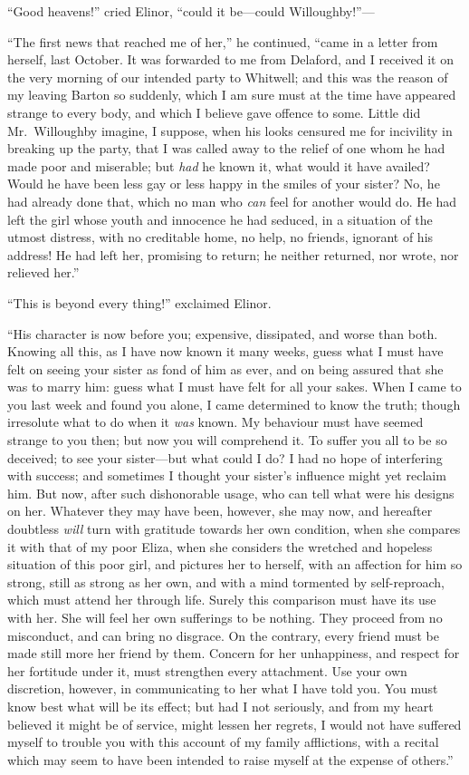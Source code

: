 ``Good heavens!'' cried Elinor, ``could it be---could
Willoughby!''---%

``The first news that reached me of her,'' he continued,
``came in a letter from herself, last October.
It was forwarded to me from Delaford, and I received it
on the very morning of our intended party to Whitwell;
and this was the reason of my leaving Barton so suddenly,
which I am sure must at the time have appeared strange
to every body, and which I believe gave offence to some.
Little did Mr.\ Willoughby imagine, I suppose, when his
looks censured me for incivility in breaking up the party,
that I was called away to the relief of one whom he
had made poor and miserable; but \emph{had} he known it,
what would it have availed?  Would he have been less
gay or less happy in the smiles of your sister?  No,
he had already done that, which no man who \emph{can} feel
for another would do.  He had left the girl whose
youth and innocence he had seduced, in a situation of
the utmost distress, with no creditable home, no help,
no friends, ignorant of his address!  He had left her,
promising to return; he neither returned, nor wrote,
nor relieved her.''

``This is beyond every thing!'' exclaimed Elinor.

``His character is now before you; expensive, dissipated,
and worse than both.  Knowing all this, as I have now
known it many weeks, guess what I must have felt on seeing
your sister as fond of him as ever, and on being assured
that she was to marry him: guess what I must have felt
for all your sakes.  When I came to you last week and
found you alone, I came determined to know the truth;
though irresolute what to do when it \emph{was} known.
My behaviour must have seemed strange to you then;
but now you will comprehend it.  To suffer you all to be
so deceived; to see your sister---but what could I do?
I had no hope of interfering with success; and sometimes
I thought your sister's influence might yet reclaim him.
But now, after such dishonorable usage, who can tell what
were his designs on her.  Whatever they may have been,
however, she may now, and hereafter doubtless \emph{will}
turn with gratitude towards her own condition, when she
compares it with that of my poor Eliza, when she considers
the wretched and hopeless situation of this poor girl,
and pictures her to herself, with an affection for him so strong,
still as strong as her own, and with a mind tormented
by self-reproach, which must attend her through life.
Surely this comparison must have its use with her.
She will feel her own sufferings to be nothing.  They
proceed from no misconduct, and can bring no disgrace.
On the contrary, every friend must be made still more
her friend by them.  Concern for her unhappiness,
and respect for her fortitude under it, must strengthen
every attachment.  Use your own discretion, however,
in communicating to her what I have told you.  You must
know best what will be its effect; but had I not seriously,
and from my heart believed it might be of service,
might lessen her regrets, I would not have suffered
myself to trouble you with this account of my family
afflictions, with a recital which may seem to have been
intended to raise myself at the expense of others.''

